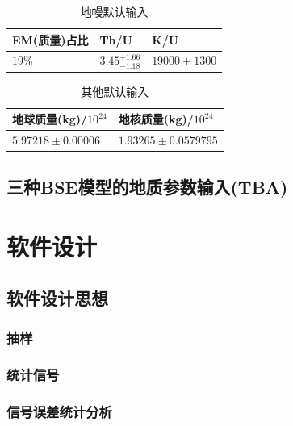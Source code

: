 				\begin{table}[H]
					\centering
					\caption{地幔默认输入}
					\begin{tabular}{p{3cm}p{3cm}p{3cm}}
						\hline
						\hline
						EM(质量)占比 & Th/U & K/U \\
						\hline
						$19\%$ & $3.45^{+1.66}_{-1.18}$ & $19000 \pm 1300$\\
						\hline
						\hline
					\end{tabular}
				\end{table}
				\begin{table}[H]
					\centering
					\caption{其他默认输入}
					\begin{tabular}{p{4cm}|p{4cm}}
						\hline
						\hline
						地球质量(kg)/$10^{24}$ & 地核质量(kg)/$10^{24}$\\
						\hline
						$5.97218 \pm 0.00006 $ & $ 1.93265 \pm 0.0579795$\\
						\hline
						\hline
					\end{tabular}
					\label{Table: Other Default Geology Input}
				\end{table}
		\section{三种BSE模型的地质参数输入(TBA)}
	\chapter{软件设计}
		\section{软件设计思想}
			\subsection{抽样}
			\subsection{统计信号}
			\subsection{信号误差统计分析}
